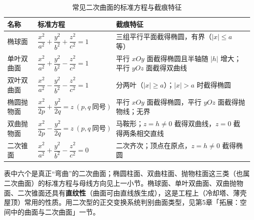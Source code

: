 \begingroup
\renewcommand{\tablename}{表}
\setlength{\LTcapwidth}{\linewidth}
\begin{longtable}{@{}llp{}@{}}
\caption{常见二次曲面的标准方程与截痕特征}\\
\toprule
名称 & 标准方程 & 截痕特征 \\
\midrule
\endhead
\bottomrule
\endlastfoot
椭球面 & $\dfrac{x^{2}}{a^{2}}+\dfrac{y^{2}}{b^{2}}+\dfrac{z^{2}}{c^{2}}=1$ & 三组平行平面截得椭圆，有界（$|x|\le a$ 等） \\
单叶双曲面 & $\dfrac{x^{2}}{a^{2}}+\dfrac{y^{2}}{b^{2}}-\dfrac{z^{2}}{c^{2}}=1$ & 平行 $xOy$ 面截得椭圆且半轴随 $|h|$ 增大；平行 $yOz$ 面截得双曲线 \\
双叶双曲面 & $\dfrac{x^{2}}{a^{2}}-\dfrac{y^{2}}{b^{2}}-\dfrac{z^{2}}{c^{2}}=1$ & 分两叶（$|x|\ge a$）；$|x|>a$ 时截得椭圆 \\
椭圆抛物面 & $\dfrac{x^{2}}{2p}+\dfrac{y^{2}}{2q}=z\ (p,q\ \text{同号})$ & 平行 $xOy$ 面截得椭圆，平行 $yOz$ 面截得抛物线；无界 \\
双曲抛物面 & $\dfrac{x^{2}}{2p}-\dfrac{y^{2}}{2q}=z\ (p,q\ \text{同号})$ & 马鞍形；$z=h\neq0$ 截得双曲线，$z=0$ 截得两条相交直线 \\
二次锥面 & $\dfrac{x^{2}}{a^{2}}+\dfrac{y^{2}}{b^{2}}-\dfrac{z^{2}}{c^{2}}=0$ & 二次齐次；顶点在原点，$z=h\neq0$ 截得椭圆 \\
\end{longtable}
\endgroup

表中六个是真正“弯曲”的二次曲面；椭圆柱面、双曲柱面、抛物柱面这三类（也属二次曲面）的标准方程与母线方向见上一小节。椭球面、单叶双曲面、双曲抛物面、二次锥面还具有\textbf{直纹性}（曲面可由直线族生成），这是工程上（冷却塔、薄壳屋顶）常用的性质。用二次型的正交变换系统判别曲面类型，见第5章「拓展：空间中的曲面与二次曲面」一节。

